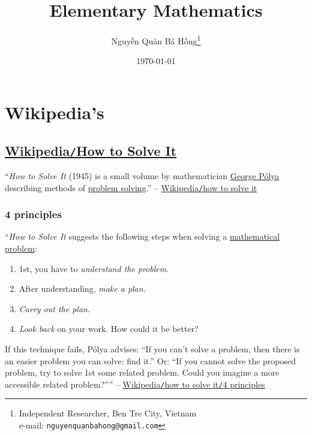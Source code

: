 \documentclass[oneside]{book}
\title{Elementary Mathematics}
\author{\selectlanguage{vietnamese} Nguyễn Quản Bá Hồng\footnote{Independent Researcher, Ben Tre City, Vietnam\\e-mail: \texttt{nguyenquanbahong@gmail.com}}}
\date{\today}
\numberwithin{equation}{section}
\begin{document}
\maketitle
\setcounter{secnumdepth}{4}
\setcounter{tocdepth}{4}
\tableofcontents


\chapter{Wikipedia's}

\section{\href{https://en.wikipedia.org/wiki/How_to_Solve_It}{Wikipedia\texttt{/}How to Solve It}}
``\textit{How to Solve It} (1945) is a small volume by mathematician \href{https://en.wikipedia.org/wiki/George_P%C3%B3lya}{George P\'olya} describing methods of \href{https://en.wikipedia.org/wiki/Problem_solving}{problem solving}.'' -- \href{https://en.wikipedia.org/wiki/How_to_Solve_It}{Wikipedia\texttt{/}how to solve it}

\subsection{4 principles}
``\textit{How to Solve It} suggests the following steps when solving a \href{https://en.wikipedia.org/wiki/Mathematical_problem}{mathematical problem}:
\begin{enumerate}
	\item 1st, you have to \textit{understand the problem}.
	\item After understanding, \textit{make a plan}.
	\item \textit{Carry out the plan}.
	\item \textit{Look back} on your work. How could it be better?
\end{enumerate}
If this technique fails, P\'olya advises: ``If you can't solve a problem, then there is an easier problem you can solve: find it.'' Or: ``If you cannot solve the proposed problem, try to solve 1st some related problem. Could you imagine a more accessible related problem?'''' -- \href{https://en.wikipedia.org/wiki/How_to_Solve_It#Four_principles}{Wikipedia\texttt{/}how to solve it\texttt{/}4 principles}
\end{document}
